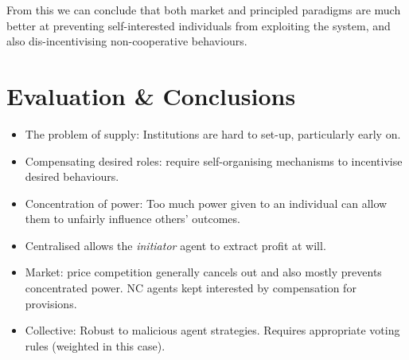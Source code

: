 From this we can conclude that both market and principled paradigms are much better at preventing self-interested individuals from exploiting the system, and also dis-incentivising non-cooperative behaviours.

\section{Evaluation \& Conclusions}

\begin{itemize}
\item The problem of supply: Institutions are hard to set-up, particularly early on.
\item Compensating desired roles: require self-organising mechanisms to incentivise desired behaviours.
\item Concentration of power: Too much power given to an individual can allow them to unfairly influence others' outcomes.
\item Centralised allows the \emph{initiator} agent to extract profit at will.
\item Market: price competition generally cancels out and also mostly prevents concentrated power. NC agents kept interested by compensation for provisions.
\item Collective: Robust to malicious agent strategies. Requires appropriate voting rules (weighted in this case).
\end{itemize}